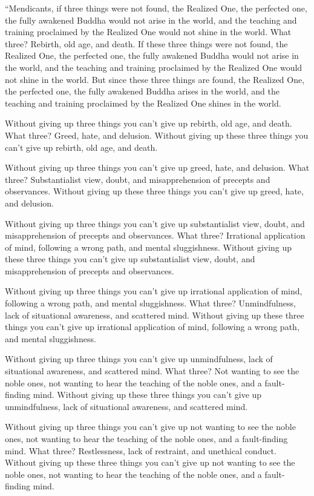 \documentclass[12pt,openany]{book}%
\begin{document}
“Mendicants, if three things were not found, the Realized One, the perfected one, the fully awakened Buddha would not arise in the world, and the teaching and training proclaimed by the Realized One would not shine in the world. What three? Rebirth, old age, and death. If these three things were not found, the Realized One, the perfected one, the fully awakened Buddha would not arise in the world, and the teaching and training proclaimed by the Realized One would not shine in the world. But since these three things are found, the Realized One, the perfected one, the fully awakened Buddha arises in the world, and the teaching and training proclaimed by the Realized One shines in the world. 

Without giving up three things you can’t give up rebirth, old age, and death. What three? Greed, hate, and delusion. Without giving up these three things you can’t give up rebirth, old age, and death. 

Without giving up three things you can’t give up greed, hate, and delusion. What three? Substantialist view, doubt, and misapprehension of precepts and observances. Without giving up these three things you can’t give up greed, hate, and delusion. 

Without giving up three things you can’t give up substantialist view, doubt, and misapprehension of precepts and observances. What three? Irrational application of mind, following a wrong path, and mental sluggishness. Without giving up these three things you can’t give up substantialist view, doubt, and misapprehension of precepts and observances. 

Without giving up three things you can’t give up irrational application of mind, following a wrong path, and mental sluggishness. What three? Unmindfulness, lack of situational awareness, and scattered mind. Without giving up these three things you can’t give up irrational application of mind, following a wrong path, and mental sluggishness. 

Without giving up three things you can’t give up unmindfulness, lack of situational awareness, and scattered mind. What three? Not wanting to see the noble ones, not wanting to hear the teaching of the noble ones, and a fault-finding mind. Without giving up these three things you can’t give up unmindfulness, lack of situational awareness, and scattered mind. 

Without giving up three things you can’t give up not wanting to see the noble ones, not wanting to hear the teaching of the noble ones, and a fault-finding mind. What three? Restlessness, lack of restraint, and unethical conduct. Without giving up these three things you can’t give up not wanting to see the noble ones, not wanting to hear the teaching of the noble ones, and a fault-finding mind. 
\end{document}

